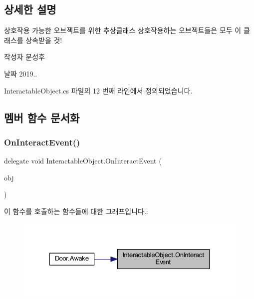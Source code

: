 \subsection{상세한 설명}
상호작용 가능한 오브젝트를 위한 추상클래스 상호작용하는 오브젝트들은 모두 이 클래스를 상속받을 것! 

\begin{DoxyAuthor}{작성자}
문성후 
\end{DoxyAuthor}
\begin{DoxyDate}{날짜}
2019.. 
\end{DoxyDate}


Interactable\+Object.\+cs 파일의 12 번째 라인에서 정의되었습니다.



\subsection{멤버 함수 문서화}
\mbox{\label{class_interactable_object_a70a579e4b09d53e6cb77b5222189d5eb}} 
\subsubsection{\texorpdfstring{OnInteractEvent()}{OnInteractEvent()}}
{\footnotesize\ttfamily delegate void Interactable\+Object.\+On\+Interact\+Event (\begin{DoxyParamCaption}\item[{Game\+Object}]{obj }\end{DoxyParamCaption})}

이 함수를 호출하는 함수들에 대한 그래프입니다.\+:
\nopagebreak
\begin{figure}[H]
\begin{center}
\leavevmode
\includegraphics[width=328pt]{d9/d55/class_interactable_object_a70a579e4b09d53e6cb77b5222189d5eb_icgraph}
\end{center}
\end{figure}
\mbox{\label{class_interactable_object_aa5c752d17471fe0daf58a4d00c218a29}} 
